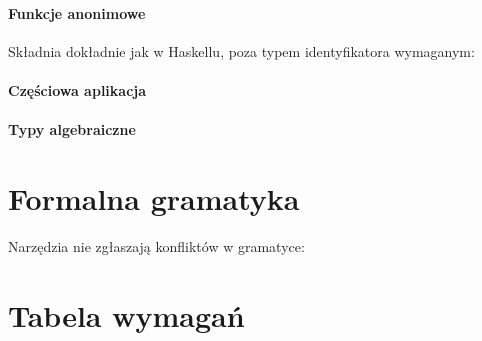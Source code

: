 \documentclass[12pt]{article}
\begin{document}
\paragraph{Funkcje anonimowe}

Składnia dokładnie jak w Haskellu, poza typem identyfikatora wymaganym:



\paragraph{Częściowa aplikacja}



\paragraph{Typy algebraiczne}



\section{Formalna gramatyka}

Narzędzia nie zgłaszają konfliktów w gramatyce:



\section{Tabela wymagań}


\end{document}

